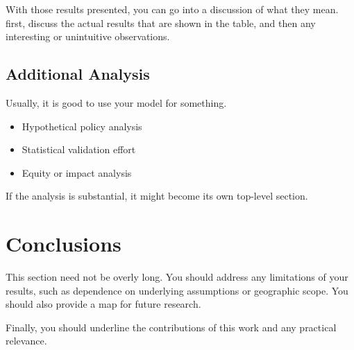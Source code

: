\documentclass[3p, authoryear]{elsarticle} %
\providecommand{\tightlist}{%
  \setlength{\itemsep}{0pt}\setlength{\parskip}{0pt}}
\begin{document}
With those results presented, you can go into a discussion of what they mean.
first, discuss the actual results that are shown in the table, and then any
interesting or unintuitive observations.

\hypertarget{additional-analysis}{%
\subsection{Additional Analysis}\label{additional-analysis}}

Usually, it is good to use your model for something.

\begin{itemize}
\tightlist
\item
  Hypothetical policy analysis
\item
  Statistical validation effort
\item
  Equity or impact analysis
\end{itemize}

If the analysis is substantial, it might become its own top-level section.

\hypertarget{conclusions}{%
\section{Conclusions}\label{conclusions}}

This section need not be overly long. You should address any limitations of your
results, such as dependence on underlying assumptions or geographic scope.
You should also provide a map for future research.

Finally, you should underline the contributions of this work and any practical
relevance.


\end{document}
